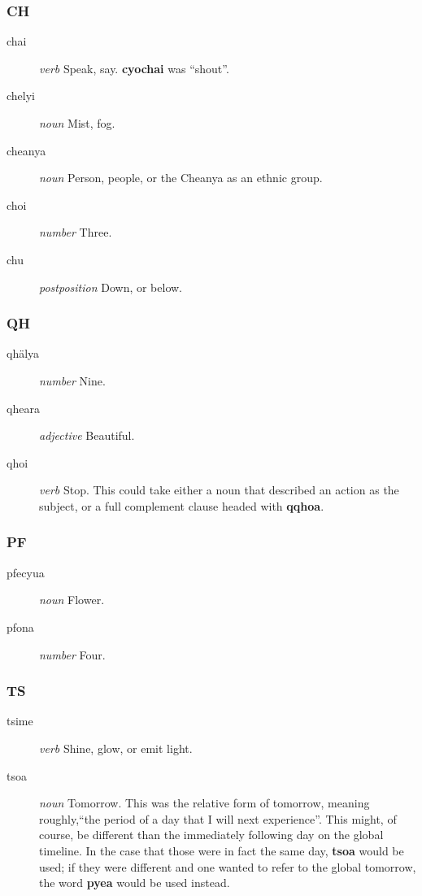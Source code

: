 \documentclass{article}
\begin{document}
\subsubsection{CH}

\begin{description}
\item [chai] \emph{verb} Speak, say.  \textbf{cyochai} was ``shout''.
\item [chelyi] \emph{noun} Mist, fog.
\item [cheanya] \emph{noun} Person, people, or the Cheanya as an ethnic group.
\item [choi] \emph{number} Three.
\item [chu] \emph{postposition} Down, or below.
\end{description}

\subsubsection{QH}

\begin{description}
\item [qh\"alya] \emph{number} Nine.
\item [qheara] \emph{adjective} Beautiful.
\item [qhoi] \emph{verb} Stop.  This could take either a noun that described an action as the subject, or a full complement clause headed with \textbf{qqhoa}.
\end{description}

\subsubsection{PF}

\begin{description}
\item [pfecyua] \emph{noun} Flower.
\item [pfona] \emph{number} Four.
\end{description}

\subsubsection{TS}

\begin{description}
\item [tsime] \emph{verb} Shine, glow, or emit light.
\item [tsoa] \emph{noun} Tomorrow.  This was the relative form of tomorrow, meaning roughly,``the period of a day that I will next experience''.  This might, of course, be different than the immediately following day on the global timeline.  In the case that those were in fact the same day, \textbf{tsoa} would be used; if they were different and one wanted to refer to the global tomorrow, the word \textbf{pyea} would be used instead.
\end{description}
\end{document}
